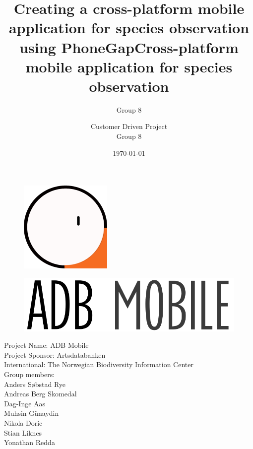 \documentclass[a4paper]{article}
\begin{document}
  \title{Creating a cross-platform mobile application for species observation using PhoneGap}

  \title{Cross-platform mobile application  for species observation}



	\author{Group 8}

\begin{figure}
    \centering
    \includegraphics[scale=0.5]{Logo_.png}
  \end{figure}


  \begin{figure}
    \centering
    \includegraphics[scale=0.5]{ADB_Mobile_Logo.png}
  \end{figure}
	\author{Customer Driven Project \\ Group 8}
	\date{\today}
	\maketitle
	\thispagestyle{empty}
	\pagebreak

	\pagestyle{empty}
	\begin{center}
		Project Name: ADB Mobile \\
		Project Sponsor: Artsdatabanken \\
		International: The Norwegian Biodiversity Information Center \\
    Group members: \\
    Anders Søbstad Rye\\
    Andreas Berg Skomedal\\
    Dag-Inge Aas\\
    Muhsin Günaydin\\
    Nikola Doric\\
    Stian Liknes\\
    Yonathan Redda
	\end{center}
	\newpage
\end{document}
